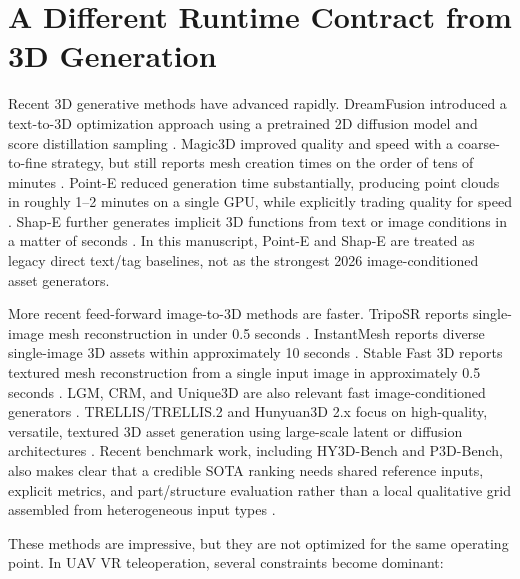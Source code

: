 ﻿\documentclass[11pt,a4paper]{article}
\begin{document}
\section{A Different Runtime Contract from 3D Generation}

Recent 3D generative methods have advanced rapidly. DreamFusion introduced a
text-to-3D optimization approach using a pretrained 2D diffusion model and score
distillation sampling \cite{poole2022dreamfusion}. Magic3D improved quality and
speed with a coarse-to-fine strategy, but still reports mesh creation times on
the order of tens of minutes \cite{lin2022magic3d}. Point-E reduced generation
time substantially, producing point clouds in roughly 1--2 minutes on a single
GPU, while explicitly trading quality for speed \cite{nichol2022pointe}.
Shap-E further generates implicit 3D functions from text or image conditions in
a matter of seconds \cite{jun2023shape}. In this manuscript, Point-E and Shap-E
are treated as legacy direct text/tag baselines, not as the strongest 2026
image-conditioned asset generators.

More recent feed-forward image-to-3D methods are faster. TripoSR reports
single-image mesh reconstruction in under 0.5 seconds \cite{tochilkin2024triposr}.
InstantMesh reports diverse single-image 3D assets within approximately 10
seconds \cite{xu2024instantmesh}. Stable Fast 3D reports textured mesh
reconstruction from a single input image in approximately 0.5 seconds
\cite{stability2024sf3d,sf3d2024}. LGM, CRM, and Unique3D are also relevant fast
image-conditioned generators \cite{tang2024lgm,wang2024crm,wu2024unique3d}.
TRELLIS/TRELLIS.2 and Hunyuan3D 2.x focus on high-quality, versatile, textured
3D asset generation using large-scale latent or diffusion architectures
\cite{xiang2024trellis,xiang2025trellis2,zhao2025hunyuan3d,hunyuan2025hunyuan3d21}.
Recent benchmark work, including HY3D-Bench and P3D-Bench, also makes clear that
a credible SOTA ranking needs shared reference inputs, explicit metrics, and
part/structure evaluation rather than a local qualitative grid assembled from
heterogeneous input types \cite{hunyuan2026hy3dbench,yang2026p3dbench}.

These methods are impressive, but they are not optimized for the same operating
point. In UAV VR teleoperation, several constraints become dominant:
\end{document}
